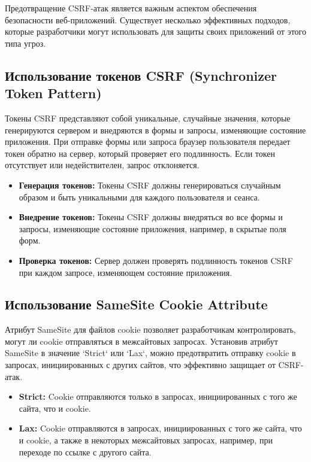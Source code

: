 \documentclass[a4paper,12pt]{diplom}
\begin{document}
	 Предотвращение CSRF-атак является важным аспектом обеспечения безопасности веб-приложений. Существует несколько эффективных подходов, которые разработчики могут использовать для защиты своих приложений от этого типа угроз.
	 
	 \subsection{Использование токенов CSRF (Synchronizer Token Pattern)}
	 
	 Токены CSRF представляют собой уникальные, случайные значения, которые генерируются сервером и внедряются в формы и запросы, изменяющие состояние приложения.  При отправке формы или запроса браузер пользователя передает токен обратно на сервер, который проверяет его подлинность.  Если токен отсутствует или недействителен, запрос отклоняется.  
	 
	 \begin{itemize}
	 	\item \textbf{Генерация токенов:}  Токены CSRF должны генерироваться случайным образом и быть уникальными для каждого пользователя и сеанса.  
	 	\item \textbf{Внедрение токенов:}  Токены CSRF должны внедряться во все формы и запросы, изменяющие состояние приложения, например, в скрытые поля форм.
	 	\item \textbf{Проверка токенов:}  Сервер должен проверять подлинность токенов CSRF при каждом запросе, изменяющем состояние приложения.
	 \end{itemize}
	 
	 \subsection{Использование SameSite Cookie Attribute}
	 
	 Атрибут SameSite для файлов cookie позволяет разработчикам контролировать, могут ли cookie отправляться в межсайтовых запросах.  Установив атрибут SameSite в значение `Strict` или `Lax`, можно предотвратить отправку cookie в запросах, инициированных с других сайтов, что эффективно защищает от CSRF-атак.
	 
	 \begin{itemize}
	 	\item \textbf{Strict:}  Cookie отправляются только в запросах, инициированных с того же сайта, что и cookie.
	 	\item \textbf{Lax:}  Cookie отправляются в запросах, инициированных с того же сайта, что и cookie, а также в некоторых межсайтовых запросах, например, при переходе по ссылке с другого сайта.
	 \end{itemize}
	 
\end{document}
